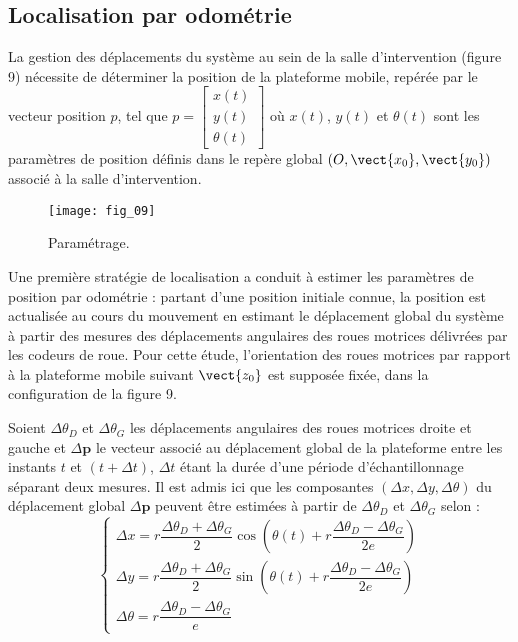 \subsection*{Localisation par odométrie}
La gestion des déplacements du système au sein de
la salle d’intervention (figure 9) nécessite de déterminer la position de la plateforme mobile, repérée
par le vecteur position $p$, tel que
$p 
= 
\begin{bmatrix}
x(t)\\
y(t)\\
\theta(t)
\end{bmatrix}
$
où $x(t)$, $y(t)$ et $\theta(t)$ sont les paramètres de position
définis dans le repère global $\left(O, \vect{x_0}, \vect{y_0}\right)$ associé à la
salle d’intervention.

\begin{figure}[!h]
\centering
\texttt{[image: fig\_09]}
\caption{\label{fig:09}  Paramétrage.}
\end{figure}

Une première stratégie de localisation a conduit à estimer les paramètres de position par odométrie :
partant d’une position initiale connue, la position est actualisée au cours du mouvement en estimant le
déplacement global du système à partir des mesures des déplacements angulaires des roues motrices
délivrées par les codeurs de roue. Pour cette étude, l’orientation des roues motrices par rapport à la
plateforme mobile suivant $\vect{z_0}$ est supposée fixée, dans la configuration de la figure 9.

Soient $\Delta \theta_D$ et $\Delta \theta_G$ les déplacements angulaires des roues motrices droite et gauche et $\Delta \bm{p}$ le vecteur
associé au déplacement global de la plateforme entre les instants $t$ et $(t + \Delta t)$, $\Delta t$ étant la durée d’une
période d’échantillonnage séparant deux mesures. Il est admis ici que les composantes $\left(\Delta x, \Delta y, \Delta \theta \right)$
du déplacement global $\Delta \bm{p}$ peuvent être estimées à partir de $\Delta \theta_D$ et $\Delta \theta_G$ selon :
$$
\left\{
\begin{array}{l}
\Delta x = r \dfrac{\Delta \theta_D+\Delta \theta_G}{2} \cos \left(\theta(t) + r \dfrac{\Delta \theta_D-\Delta \theta_G}{2e}\right) \\
\Delta y = r \dfrac{\Delta \theta_D+\Delta \theta_G}{2} \sin \left(\theta(t) + r \dfrac{\Delta \theta_D-\Delta \theta_G}{2e}\right) \\
\Delta \theta = r \dfrac{\Delta \theta_D-\Delta \theta_G}{e}
\end{array}
\right.
$$

